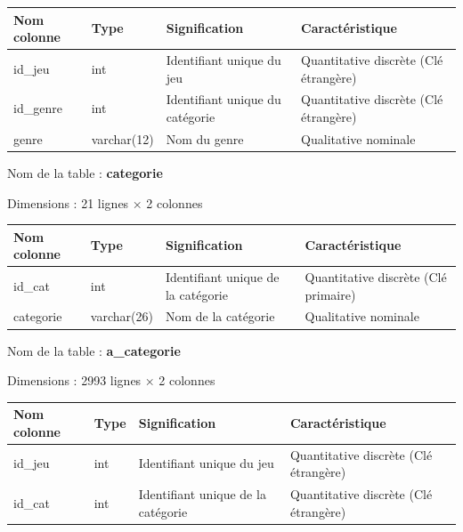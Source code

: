 \documentclass[mstat,12pt]{unswthesis}
\begin{document}
\begin{center}
\begin{tabular}{|p{3cm}|p{2.5cm}|p{3.5cm}|p{3.5cm}|}
\hline
\textbf{Nom colonne} & \textbf{Type} & \textbf{Signification} & \textbf{Caractéristique} \\
\hline
id\_jeu & int & Identifiant unique du jeu & Quantitative discrète (Clé étrangère) \\
\hline
id\_genre & int & Identifiant unique du catégorie & Quantitative discrète (Clé étrangère) \\
\hline
genre & varchar(12) & Nom du genre & Qualitative nominale \\
\hline
\end{tabular}
\end{center}

\vspace{1em}
\noindent Nom de la table : \textbf{categorie}

\noindent Dimensions : 21 lignes × 2 colonnes

\begin{center}
\begin{tabular}{|p{3cm}|p{2.5cm}|p{3.5cm}|p{3.5cm}|}
\hline
\textbf{Nom colonne} & \textbf{Type} & \textbf{Signification} & \textbf{Caractéristique} \\
\hline
id\_cat & int & Identifiant unique de la catégorie & Quantitative discrète (Clé primaire) \\
\hline
categorie & varchar(26) & Nom de la catégorie & Qualitative nominale \\
\hline
\end{tabular}
\end{center}

\vspace{1em}
\noindent Nom de la table : \textbf{a\_categorie}

\noindent Dimensions : 2993 lignes × 2 colonnes

\begin{center}
\begin{tabular}{|p{3cm}|p{2.5cm}|p{3.5cm}|p{3.5cm}|}
\hline
\textbf{Nom colonne} & \textbf{Type} & \textbf{Signification} & \textbf{Caractéristique} \\
\hline
id\_jeu & int & Identifiant unique du jeu & Quantitative discrète (Clé étrangère) \\
\hline
id\_cat & int & Identifiant unique de la catégorie & Quantitative discrète (Clé étrangère) \\
\hline
\end{tabular}
\end{center}
\end{document}
